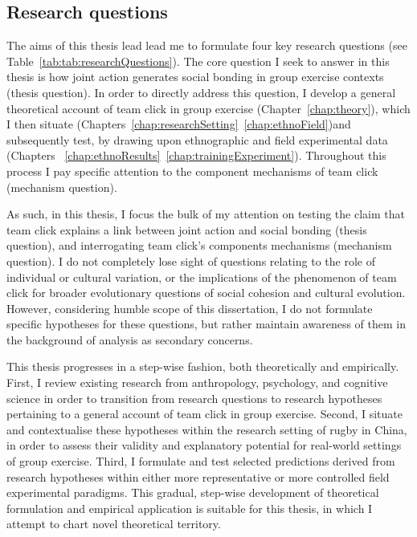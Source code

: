 \begin{CJK}{UTF8}{gbsn}
\subsection{Research questions}
The aims of this thesis lead lead me to formulate four key research questions  (see Table~\ref{tab:tab:researchQuestions}).  The core question I seek to answer in this thesis is how joint action generates social bonding in group exercise contexts (thesis question).  In order to directly address this question, I develop a general theoretical account of team click in group exercise (Chapter~\ref{chap:theory}), which I then situate (Chapters~\ref{chap:researchSetting}\nobreakdash~\ref{chap:ethnoField})and subsequently test, by drawing upon ethnographic and field experimental data (Chapters ~\ref{chap:ethnoResults}\nobreakdash~\ref{chap:trainingExperiment}).  Throughout this process I pay specific attention to the component mechanisms of team click (mechanism question).



As such, in this thesis,  I focus the bulk of my attention on testing the claim that team click explains a link between joint action and social bonding (thesis question), and interrogating team click's components mechanisms (mechanism question).   I do not completely lose sight of questions relating to the role of individual or cultural variation, or the implications of the phenomenon of team click for broader evolutionary questions of social cohesion and cultural evolution.  However, considering humble scope of this dissertation, I do not formulate specific hypotheses for these questions, but rather maintain awareness of them in the background of analysis as secondary concerns.

This thesis progresses in a step-wise fashion, both theoretically and empirically.  First, I review existing research from anthropology, psychology, and cognitive science in order to transition from research questions to research hypotheses pertaining to a general account of team click in group exercise.  Second, I situate and contextualise these hypotheses within the research setting of rugby in China, in order to assess their validity and explanatory potential for real-world settings of group exercise.  Third, I formulate and test selected predictions derived from research hypotheses within either more representative or more controlled field experimental paradigms.
This gradual, step-wise development of theoretical formulation and empirical application is suitable for this thesis, in which I attempt to chart novel theoretical territory.



\end{CJK}
